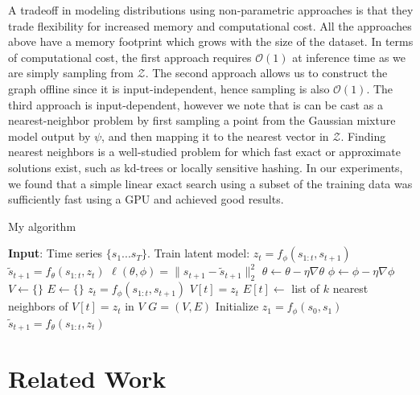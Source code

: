 \documentclass{article}
\begin{document}
A tradeoff in modeling distributions using non-parametric approaches is that they trade flexibility for increased memory and computational cost.
All the approaches above have a memory footprint which grows with the size of the dataset.
In terms of computational cost, the first approach requires $\mathcal{O}(1)$ at inference time as we are simply sampling from $\mathcal{Z}$.
The second approach allows us to construct the graph offline since it is input-independent, hence sampling is also $\mathcal{O}(1)$.
The third approach is input-dependent, however we note that is can be cast as a nearest-neighbor problem by first sampling a point from the Gaussian mixture model output by $\psi$, and then mapping it to the nearest vector in $\mathcal{Z}$. Finding nearest neighbors is a well-studied problem for which fast exact or approximate solutions exist, such as kd-trees or locally sensitive hashing. In our experiments, we found that a simple linear exact search using a subset of the training data was sufficiently fast using a GPU and achieved good results.



\begin{algorithm}
  \caption{My algorithm}\label{algo}
  \begin{algorithmic}[1]
    \State \textbf{Input}: Time series $\{s_1...s_T\}$.
    \State Train latent model:
    \State $z_t = f_{\phi}(s_{1:t}, s_{t+1})$
    \State $\tilde{s}_{t+1} = f_{\theta}(s_{1:t}, z_t)$
    \State $\ell(\theta, \phi) = \|s_{t+1} - \tilde{s}_{t+1} \|_2^2$
    \State $\theta \leftarrow \theta - \eta \nabla \theta$
    \State $\phi \leftarrow \phi - \eta \nabla \phi$
    \EndWhile
    \State $V \leftarrow \{ \}$
    \State $E \leftarrow \{ \}$
    \State $z_t = f_{\phi}(s_{1:t}, s_{t+1})$
    \State $V[t] = z_t$
    \EndFor
    \State $E[t] \leftarrow $ list of $k$ nearest neighbors of $V[t] = z_t$ in $V$
    \EndFor
    \Return $G = (V, E)$
    \EndProcedure
    \State Initialize $z_1 = f_{\phi}(s_0, s_1)$
    \State $\tilde{s}_{t+1} = f_{\theta}(s_{1:t}, z_t)$
    \EndFor
    \EndProcedure
  \end{algorithmic}
\end{algorithm}


\section{Related Work}
\end{document}

